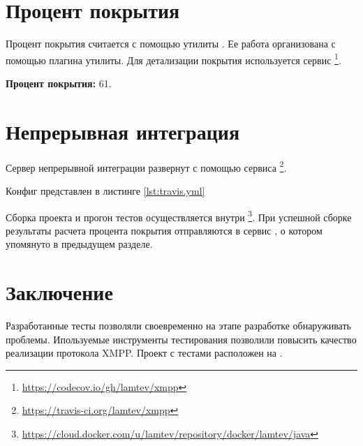 \section{Процент покрытия}

Процент покрытия считается с помощью утилиты . Ее работа организована с помощью  плагина утилиты. Для детализации покрытия используется сервис \href{https://codecov.io/gh/lamtev/xmpp}{}\footnote{\href{https://codecov.io/gh/lamtev/xmpp}{https://codecov.io/gh/lamtev/xmpp}}.

\textbf{Процент покрытия:} 61.

\section{Непрерывная интеграция}

Сервер непрерывной интеграции развернут с помощью сервиса \href{https://travis-ci.org/lamtev/xmpp}{}\footnote{\href{https://travis-ci.org/lamtev/xmpp}{https://travis-ci.org/lamtev/xmpp}}.

Конфиг  представлен в листинге \ref{lst:travis.yml} 

Сборка проекта и прогон тестов осуществляется внутри \href{https://cloud.docker.com/u/lamtev/repository/docker/lamtev/java}{}\footnote{\href{https://cloud.docker.com/u/lamtev/repository/docker/lamtev/java}{https://cloud.docker.com/u/lamtev/repository/docker/lamtev/java}}. При успешной сборке результаты расчета процента покрытия отправляются в сервис , о котором упомянуто в предыдущем разделе.


\section{Заключение}

Разработанные тесты позволяли своевременно на этапе разработке обнаруживать проблемы. Ипользуемые инструменты тестирования позволили повысить качество реализации протокола XMPP. Проект с тестами расположен на \href{https://github.com/lamtev/xmpp}{}.


